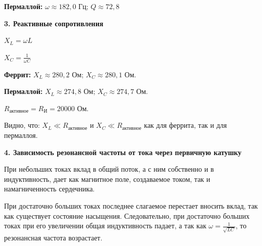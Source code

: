 \documentclass[a4paper,12pt]{article} %
\begin{document}
\textbf{Пермаллой:} $\omega \approx 182,0$ Гц; $Q \approx 72,8$

\vspace{10mm}
\textbf{{\large 3. Реактивные сопротивления}}

$X_L = \omega L$

$X_C = \frac{1}{\omega C}$

\vspace{5mm}
\textbf{Феррит:} $X_L\approx 280,2$ Ом; $X_C \approx 280,1$ Ом.

\vspace{5mm}

\textbf{Пермаллой:} $X_L \approx 274,8$ Ом; $X_C \approx 274,7$ Ом.

\vspace{5mm}

$R_{\text{активное}} = R_{\text{И}} = 20000$ Ом.

Видно, что: $X_L \ll R_{\text{активное}}$ и $X_C \ll R_{\text{активное}}$ как для феррита, так и для пермаллоя.

\vspace{10mm}
\textbf{{\large 4. Зависимость резонансной частоты от тока через первичную катушку}}

При небольших токах вклад в общий поток, а с ним собственно и в индуктивность, дает как магнитное поле, создаваемое током, так и намагниченность сердечника. 

При достаточно больших токах последнее слагаемое перестает вносить вклад, так как существует состояние насыщения. Следовательно, при достаточно больших токах при его увеличении общая индуктивность падает, а так как $\omega = \frac{1}{\sqrt{LC}}$, то резонансная частота возрастает. 
\end{document}
